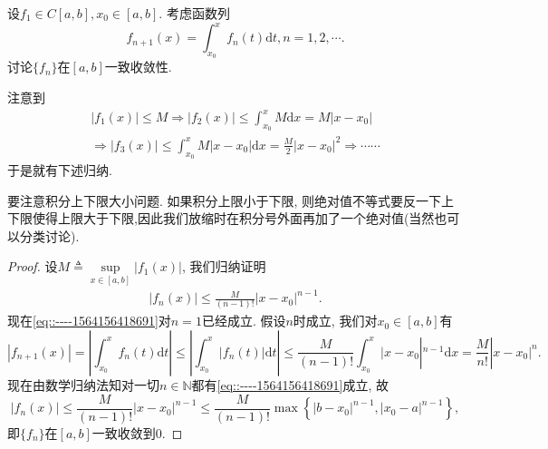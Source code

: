 \documentclass[../../main.tex]{subfiles}
\begin{document}
\begin{example}
设$f_1\in C[a,b],x_0\in[a,b]$. 考虑函数列
$$
f_{n+1}(x)=\int_{x_0}^{x}f_n(t)\mathrm{d}t,n=1,2,\cdots.
$$
讨论$\{f_n\}$在$[a,b]$一致收敛性.
\end{example}
\begin{note}
注意到
\begin{gather*}
\left| f_1\left( x \right) \right|\leqslant M\Rightarrow \left| f_2\left( x \right) \right|\leqslant \int_{x_0}^x{M\mathrm{d}x}=M\left| x-x_0 \right|
\\
\Rightarrow \left| f_3\left( x \right) \right|\leqslant \int_{x_0}^x{M\left| x-x_0 \right|\mathrm{d}x}=\frac{M}{2}\left| x-x_0 \right|^2\Rightarrow \cdots \cdots 
\end{gather*}
于是就有下述归纳.
\end{note}
\begin{remark}
要注意积分上下限大小问题. 如果积分上限小于下限, 则绝对值不等式要反一下上下限使得上限大于下限,因此我们放缩时在积分号外面再加了一个绝对值(当然也可以分类讨论).
\end{remark}
\begin{proof}
设$M\triangleq\sup\limits_{x\in[a,b]}|f_1(x)|$, 我们归纳证明
\begin{align}
|f_n(x)|\leqslant\frac{M}{(n-1)!}|x-x_0|^{n-1}\label{eq::----1564156418691}.
\end{align}
现在\eqref{eq::----1564156418691}对$n=1$已经成立. 假设$n$时成立, 我们对$x_0\in [a,b]$有
$$
|f_{n+1}(x)|=\left| \int_{x_0}^x{f_n(t)\mathrm{d}t} \right|\leqslant \left| \int_{x_0}^x{\left| f_n(t) \right|\mathrm{d}t} \right|\leqslant \frac{M}{(n-1)!}\int_{x_0}^x{|x}-x_0|^{n-1}\mathrm{d}x=\frac{M}{n!}|x-x_0|^n.
$$
现在由数学归纳法知对一切$n\in\mathbb{N}$都有\eqref{eq::----1564156418691}成立, 故
$$
|f_n(x)|\leqslant\frac{M}{(n-1)!}|x-x_0|^{n-1}\leqslant\frac{M}{(n-1)!}\max\left\{|b-x_0|^{n-1},|x_0-a|^{n-1}\right\},
$$
即$\{f_n\}$在$[a,b]$一致收敛到$0$.

\end{proof}
\end{document}
